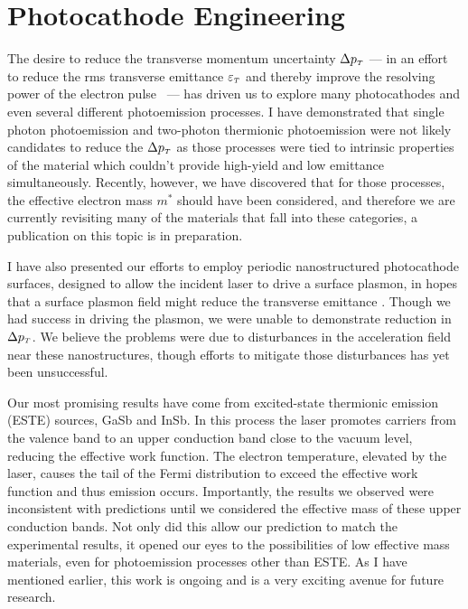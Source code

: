 \section{Photocathode Engineering}

The desire to reduce the transverse momentum uncertainty $\Delta p_{{\scriptscriptstyle T}}$ --- in an effort to reduce the rms transverse emittance $\varepsilon_{{\scriptscriptstyle T}}$ and thereby improve the resolving power of the electron pulse~\cite{berger_dc_2009} --- has driven us to explore many photocathodes and even several different photoemission processes.
I have demonstrated that single photon photoemission and two-photon thermionic photoemission were not likely candidates to reduce the $\Delta p_{{\scriptscriptstyle T}}$ as those processes were tied to intrinsic properties of the material which couldn't provide high-yield and low emittance simultaneously.
Recently, however, we have discovered that for those processes, the effective electron mass $m^*$ should have been considered, and therefore we are currently revisiting many of the materials that fall into these categories, a publication on this topic is in preparation.

I have also presented our efforts to employ periodic nanostructured photocathode surfaces, designed to allow the incident laser to drive a surface plasmon, in hopes that a surface plasmon field might reduce the transverse emittance \cite{zawadzka_evanescent_2001,kupersztych_ponderomotive_2001,kupersztych_anomalous_2005,li_surface_2013}.
Though we had success in driving the plasmon, we were unable to demonstrate reduction in $\Delta p_{{\scriptscriptstyle T}}$.
We believe the problems were due to disturbances in the acceleration field near these nanostructures, though efforts to mitigate those disturbances has yet been unsuccessful.

Our most promising results have come from excited-state thermionic emission (ESTE) sources, GaSb and InSb.
In this process the laser promotes carriers from the valence band to an upper conduction band close to the vacuum level, reducing the effective work function.
The electron temperature, elevated by the laser, causes the tail of the Fermi distribution to exceed the effective work function and thus emission occurs.
Importantly, the results we observed were inconsistent with predictions until we considered the effective mass of these upper conduction bands.
Not only did this allow our prediction to match the experimental results, it opened our eyes to the possibilities of low effective mass materials, even for photoemission processes other than ESTE.
As I have mentioned earlier, this work is ongoing and is a very exciting avenue for future research.


